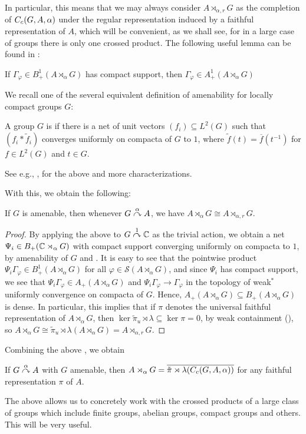 In particular, this means that we may always consider $A \rtimes_{\alpha,r}G$ as the completion of $C_c(G,A,\alpha)$ under the regular representation induced by a faithful representation of $A$, which will be convenient, as we shall see, for in a large case of groups there is only one crossed product. The following useful lemma can be found in \cite[Lemma 7.7.6]{pedersenalgauto}:
\begin{lemma}
If $\Gamma_\varphi \in B_+^1(A \rtimes_\alpha G)$ has compact support, then $\Gamma_\varphi \in A_+^1(A \rtimes_\alpha G)$
\label{crossed:compactposdef}
\end{lemma}

We recall one of the several equivalent definition of amenability for locally compact groups $G$:
\begin{definition}
A group $G$ is  if there is a net of unit vectors $(f_i) \subseteq L^2(G)$ such that $(f_i \ast \tilde f_i)$ converges uniformly on compacta of $G$ to $1$, where $\tilde f (t) = \overline f(t^{-1})$ for $f \in L^2(G)$ and $t \in G$.
\end{definition}
See e.g., \cite[Appendix G]{bekka2008kazhdan}, \cite[Proposition 7.3.7 and 7.3.8]{pedersenalgauto} for the above and more characterizations. 

With this, we obtain the following:
\begin{theorem}
If $G$ is amenable, then whenever $G \stackrel{\alpha}{\curvearrowright} A$, we have $A \rtimes_\alpha G \cong A \rtimes_{\alpha,r}G$.
\label{cross:amenable}
\end{theorem}
\begin{proof}
By applying the above to $G \stackrel{1}{\curvearrowright} \mathbb{C}$ as the trivial action, we obtain a net $\Psi_i \in B_{+}(\mathbb{C} \rtimes_\alpha G)$ with compact support converging uniformly on compacta to $1$, by amenability of $G$ and \cite[Lemma 7.2.4]{pedersenalgauto}. It is easy to see that the pointwise product $\Psi_i \Gamma_\varphi \in B_+^1(A \rtimes_\alpha G)$ for all $\varphi \in \mathcal{S}(A \rtimes_\alpha G)$, and since $\Psi_i$ has compact support, we see that $\Psi_i \Gamma_\varphi \in A_+(A \rtimes_\alpha G)$ and $\Psi_i \Gamma_\varphi \to \Gamma_\varphi$ in the topology of weak$^*$ uniformly convergence on compacta of $G$. Hence, $A_+(A \rtimes_\alpha G) \subseteq B_+(A \rtimes_\alpha G)$ is dense. In particular, this implies that if $\pi$ denotes the universal faithful representation of $A \rtimes_\alpha G$, then $\ker \tilde \pi_u \rtimes \lambda \subseteq \ker \pi = 0$, by weak containment (\cite[80]{dixmier1969c}), so $A \rtimes_\alpha G \cong \tilde \pi_u \rtimes \lambda( A \rtimes_\alpha G) = A \rtimes_{\alpha,r}G$.
\end{proof}
Combining the above , we obtain
\begin{corollary}
If $G \stackrel{\alpha}{\curvearrowright} A$ with $G$ amenable, then $A \rtimes_\alpha G = \overline{\tilde \pi \rtimes \lambda (C_c(G,A,\alpha))}$ for any faithful representation $\pi$ of $A$.
\end{corollary}
The above allows us to concretely work with the crossed products of a large class of groups which include finite groups, abelian groups, compact groups and others. This will be very useful.

